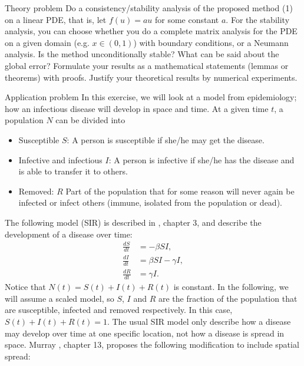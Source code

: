\clearpage

\begin{railingbox}{Theory problem}
    Do a consistency/stability analysis of the proposed method (1) on a linear PDE, that is, let \(f(u) = au\) for some constant \(a\).
    For the stability analysis, you can choose whether you do a complete matrix analysis for the PDE on a given domain (e.g. \(x \in (0, 1)\)) with boundary conditions, or a Neumann analysis. Is the method unconditionally stable? What can be said about the global error?
    Formulate your results as a mathematical statements (lemmas or theorems) with proofs.
    Justify your theoretical results by numerical experiments.
\end{railingbox}



\begin{railingbox}{Application problem}
    In this exercise, we will look at a model from epidemiology; how an infectious disease will develop in space and time.
    At a given time \(t\), a population \(N\) can be divided into
    \begin{itemize}
        \item Susceptible \(S\): A person is susceptible if she/he may get the disease.
        \item Infective and infectious \(I\): A person is infective if she/he has the disease and is able to transfer it to others.
        \item Removed: \(R\) Part of the population that for some reason will never again be infected or infect others (immune, isolated from the population or dead).
    \end{itemize}
    The following model (SIR) is described in \cite{murray2002mathematical}, chapter 3, and describe the development of a disease over time:
    \begin{align}
        \frac{dS}{dt} & = -\beta SI, \nonumber \\
        \frac{dI}{dt} & = \beta SI - \gamma I, \label{eq:sir_model} \\
        \frac{dR}{dt} & = \gamma I. \nonumber
    \end{align}
    Notice that \(N(t) = S(t) + I(t) + R(t)\) is constant.
    In the following, we will assume a scaled model, so \(S\), \(I\) and \(R\) are the fraction of the population that are susceptible, infected and removed respectively. In this case, \(S(t) + I(t) + R(t) = 1\).
    The usual SIR model only describe how a disease may develop over time at one specific location, not how a disease is spread in space. Murray \cite{murray2002mathematical}, chapter 13, proposes the following modification to include spatial spread:

\end{railingbox}
